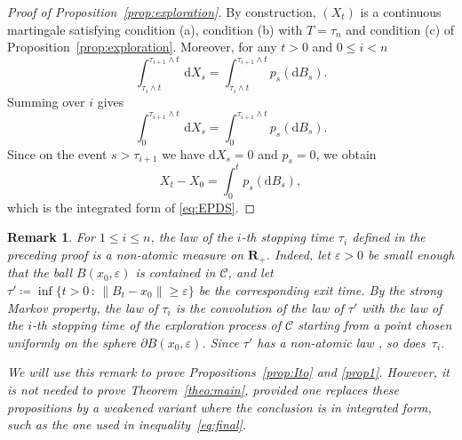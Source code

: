 \documentclass[10pt,a4paper]{amsart}
\newcommand{\R}{\mathbf{R}}
\newcommand{\e}{\varepsilon}
\renewcommand{\leq}{\leqslant}
\renewcommand{\geq}{\geqslant}
\newtheorem{remark}{Remark}
\begin{document}
\begin{proof}[Proof of Proposition~\ref{prop:exploration}]
 By construction, $(X_t)$ is a continuous martingale satisfying condition (a), condition (b) with $T=\tau_n$ and condition (c) of Proposition~\ref{prop:exploration}. 
Moreover, for any $t>0$ and $0 \leq i < n$
\[ \int_{\tau_i \wedge t}^{\tau_{i+1} \wedge t} \, \mathrm{d}X_s = 
\int_{\tau_i \wedge t}^{\tau_{i+1} \wedge t} p_s(\mathrm{d}B_s).
\]
Summing over $i$ gives
\[ \int_{0}^{\tau_{i+1} \wedge t} \, \mathrm{d}X_s = 
\int_{0}^{\tau_{i+1} \wedge t} p_s(\mathrm{d}B_s).
\]
Since on the event $s> \tau_{i+1}$ we have $\mathrm{d}X_s =0$ and $p_s=0$, we obtain
\[ X_t - X_0 = \int_{0}^t p_s( \mathrm{d}B_s ) ,\]
which is the integrated form of \eqref{eq:EPDS}.
\end{proof}
 
\begin{remark} \label{rema:C1}
For $1 \leq i \leq n$, the law of the $i$-th stopping time $\tau_i$ defined in the preceding proof is a non-atomic measure on $\R_+$. Indeed, let $\e>0$ be small enough that the ball $B(x_0,\e)$ is contained in $\mathscr{C}$, and let $\tau' \coloneqq \inf \{ t>0 \, :\, \|B_t-x_0\| \geq \e \}$ be the corresponding exit time. By the strong Markov property, the law of $\tau_i$ is the convolution of the law of $\tau'$ with the law of the $i$-th stopping time of the exploration process of $\mathscr{C}$ starting from a point chosen uniformly on the sphere $\partial B(x_0,\e)$. Since $\tau'$ has a non-atomic law \cite{CT62}, so does~$\tau_i$.
 
We will use this remark to prove Propositions~\ref{prop:Ito} and \ref{prop1}. However, it is not needed to prove Theorem~\ref{theo:main}, provided one replaces these propositions by a weakened variant where the conclusion is in integrated form, such as the one used in inequality~\eqref{eq:final}.
\end{remark}
 
\end{document}
